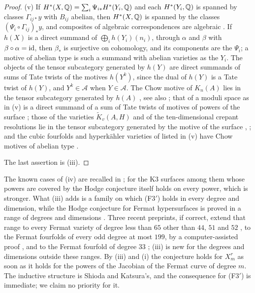 \begin{proof}
(v) If $H^{*}(X,\mathbb{Q})=\sum_{i}\Psi_{i*}H^{*}(Y_{i},\mathbb{Q})$ and each
$H^{*}(Y_{i},\mathbb{Q})$ is spanned by classes $\Gamma_{ij*}y$ with $B_{ij}$
abelian, then $H^{*}(X,\mathbb{Q})$ is spanned by the classes
$(\Psi_{i}\circ\Gamma_{ij})_{*}y$, and composites of algebraic
correspondences are algebraic \cite[Chapter~16]{Ful98}. If $h(X)$ is a
direct summand of $\bigoplus_{i}h(Y_{i})(n_{i})$, through $\alpha$ and
$\beta$ with $\beta\circ\alpha=\operatorname{id}$, then $\beta_{*}$ is surjective on
cohomology, and its components are the $\Psi_{i}$; a motive of abelian type
is such a summand with abelian varieties as the $Y_{i}$. The objects of the
tensor subcategory generated by $h(Y)$ are direct summands of sums of Tate
twists of the motives $h(Y^{k})$, since the dual of $h(Y)$ is a Tate twist of
$h(Y)$, and $Y^{k}\in\mathcal{A}$ when $Y\in\mathcal{A}$. The Chow motive of
$K_{n}(A)$ lies in the tensor subcategory generated by $h(A)$
\cite[Theorem~2.7, Corollary~2.8]{Xu15}, see also \cite[Theorem~1.5]{FTV19};
that of a moduli space as in (v) is a direct summand of a sum of Tate twists
of motives of powers of the surface \cite[Theorem~0.1]{Bue20}; those of the
varieties $\widetilde K_{v}(A,H)$ and of the ten-dimensional crepant
resolutions lie in the tensor subcategory generated by the motive of the
surface \cite[Theorem~1.1]{Flo23}, \cite[Corollary~4.5]{FFZ21}; and the cubic
fourfolds and hyperk\"ahler varieties of \cite{ABLP26} listed in (v) have
Chow motives of abelian type \cite[Theorem~3.5 and its proof,
Proposition~3.9, Theorem~4.2]{ABLP26}.

The last assertion is (iii).
\end{proof}

The known cases of (iv) are recalled in ; for the K3
surfaces among them whose powers are covered by \cite{Var22} the Hodge
conjecture itself holds on every power, which is stronger. What (iii) adds is
a family on which \textup{(F3$'$)} holds in every degree and dimension, while
the Hodge conjecture for Fermat hypersurfaces is proved in a range of degrees
and dimensions \cite{Shi79b}. Three recent preprints, if
correct, extend that range to every Fermat variety of degree less than $65$
other than $44$, $51$ and $52$ \cite{MMMV26}, to the Fermat fourfolds of
every odd degree at most $199$, by a computer-assisted proof \cite{Jum26},
and to the Fermat fourfold of degree $33$ \cite{FK26}; (iii) is new for the
degrees and dimensions outside these ranges. By (iii) and
(i) the conjecture holds for $X^{r}_{m}$ as soon as it
holds for the powers of the Jacobian of the Fermat curve of degree $m$. The
inductive structure is Shioda and Katsura's, and the consequence for
\textup{(F3$'$)} is immediate; we claim no priority for it.

